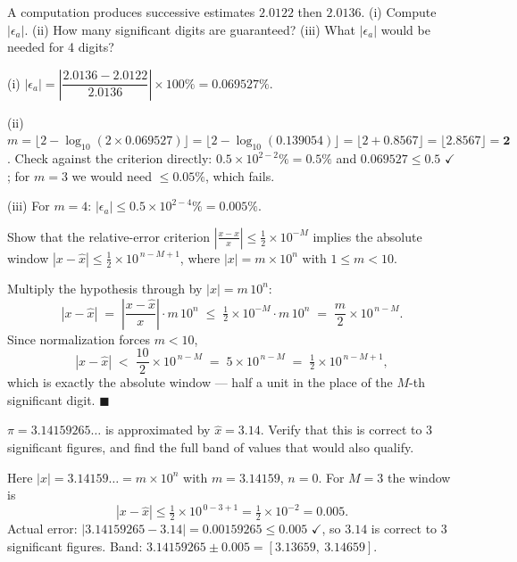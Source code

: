 \begin{probbox}
 A computation produces successive estimates $2.0122$ then $2.0136$. (i) Compute $|\epsilon_a|$. (ii) How many significant digits are guaranteed? (iii) What $|\epsilon_a|$ would be needed for 4 digits?

\ans (i) $|\epsilon_a| = \left|\dfrac{2.0136-2.0122}{2.0136}\right|\times100\% = 0.069527\%$.

(ii) $m = \lfloor 2-\log_{10}(2\times0.069527)\rfloor = \lfloor 2-\log_{10}(0.139054)\rfloor = \lfloor 2+0.8567\rfloor = \lfloor 2.8567\rfloor = \mathbf{2}$.
Check against the criterion directly: $0.5\times10^{2-2}\% = 0.5\%$ and $0.069527 \le 0.5$ $\checkmark$; for $m=3$ we would need $\le 0.05\%$, which fails.

(iii) For $m=4$: $|\epsilon_a| \le 0.5\times10^{2-4}\% = \mathbf{0.005\%}$.

 Show that the relative-error criterion $\left|\frac{x-\hat x}{x}\right| \le \tfrac12\times10^{-M}$ implies the absolute window $|x-\hat x| \le \tfrac12\times10^{\,n-M+1}$, where $|x| = m\times10^n$ with $1\le m<10$.

\ans Multiply the hypothesis through by $|x| = m\,10^n$:
\[
|x-\hat x| \;=\; \left|\frac{x-\hat x}{x}\right|\cdot m\,10^{n} \;\le\; \tfrac12\times10^{-M}\cdot m\,10^{n} \;=\; \frac{m}{2}\times10^{\,n-M}.
\]
Since normalization forces $m<10$,
\[
|x-\hat x| \;<\; \frac{10}{2}\times10^{\,n-M} \;=\; 5\times10^{\,n-M} \;=\; \tfrac12\times10^{\,n-M+1},
\]
which is exactly the absolute window --- half a unit in the place of the $M$-th significant digit. $\blacksquare$

 $\pi = 3.14159265\dots$ is approximated by $\hat x = 3.14$. Verify that this is correct to 3 significant figures, and find the full band of values that would also qualify.

\ans Here $|x| = 3.14159\ldots = m\times10^n$ with $m=3.14159$, $n=0$. For $M=3$ the window is
\[
|x-\hat x| \le \tfrac12\times10^{\,0-3+1} = \tfrac12\times10^{-2} = 0.005 .
\]
Actual error: $|3.14159265-3.14| = 0.00159265 \le 0.005$ $\checkmark$, so $3.14$ is correct to 3 significant figures.
Band: $3.14159265 \pm 0.005 = [\mathbf{3.13659},\ \mathbf{3.14659}]$.
\end{probbox}

